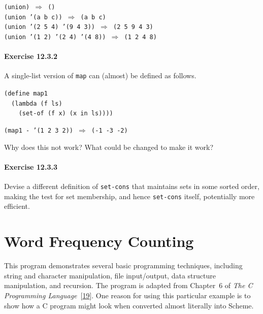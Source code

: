 \begin{alltt}
(union) \(\Rightarrow\) ()
(union '(a b c)) \(\Rightarrow\) (a b c)
(union '(2 5 4) '(9 4 3)) \(\Rightarrow\) (2 5 9 4 3)
(union '(1 2) '(2 4) '(4 8)) \(\Rightarrow\) (1 2 4 8)
\end{alltt}

\paragraph{Exercise \label{examples_g167}12.3.2}


\label{examples_s20}A single-list version of \label{examples_s21}\texttt{map} can (almost) be defined as follows.


\begin{alltt}
(define map1
  (lambda (f ls)
    (set-of (f x) (x in ls))))

(map1 - '(1 2 3 2)) \(\Rightarrow\) (-1 -3 -2)
\end{alltt}


Why does this not work?
What could be changed to make it work?


\paragraph{Exercise \label{examples_g168}12.3.3}


\label{examples_s22}Devise a different definition of \texttt{set-cons} that maintains sets
in some sorted order, making the test for set membership, and hence
\texttt{set-cons} itself, potentially more efficient.



\section{\label{examples_g169}\label{examples_h4}Word Frequency Counting\label{examples_SECTEXWORDFREQ}}



This program demonstrates several basic programming techniques,
including string and character manipulation, file input/output,
data structure manipulation, and recursion.
The program is
adapted from Chapter 6 of \textit{The C Programming Language} [\hyperref[bibliography_g237]{19}].
One reason for using this particular example is to show how a
\label{examples_s23}C program might look when converted almost literally into
Scheme.


